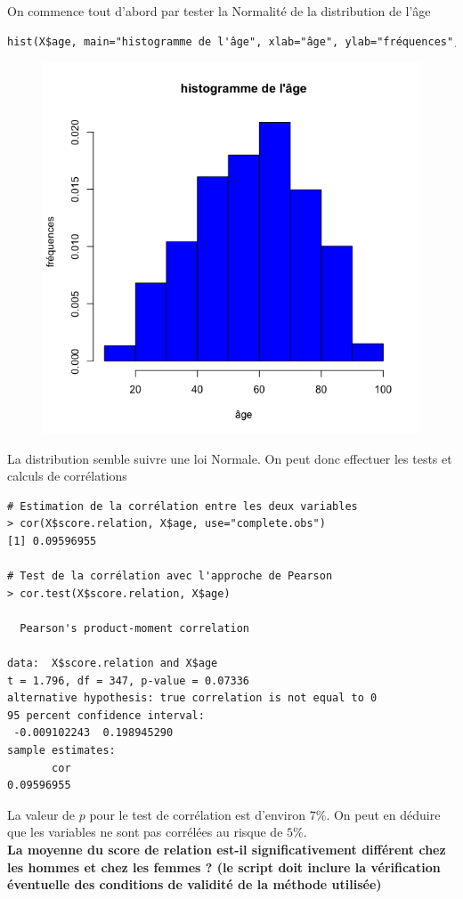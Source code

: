 On commence tout d'abord par tester la Normalité de la distribution de l'âge
\begin{lstlisting}[language=html]
hist(X$age, main="histogramme de l'âge", xlab="âge", ylab="fréquences",freq=F,col="blue")
\end{lstlisting}
\begin{figure}[H]\begin{center}\includegraphics[scale=0.5]{ilu/DEV21.png}\end{center}\end{figure}
La distribution semble suivre une loi Normale. On peut donc effectuer les tests et calculs de corrélations
\begin{lstlisting}[language=html]
# Estimation de la corrélation entre les deux variables 
> cor(X$score.relation, X$age, use="complete.obs")
[1] 0.09596955

# Test de la corrélation avec l'approche de Pearson
> cor.test(X$score.relation, X$age)

  Pearson's product-moment correlation

data:  X$score.relation and X$age
t = 1.796, df = 347, p-value = 0.07336
alternative hypothesis: true correlation is not equal to 0
95 percent confidence interval:
 -0.009102243  0.198945290
sample estimates:
       cor 
0.09596955 
\end{lstlisting}
La valeur de $p$ pour le test de corrélation est d'environ $7\%$. On peut en déduire que les variables ne sont pas corrélées au risque de $5\%$.\newline
\\
\textbf{La moyenne du score de relation est-il significativement différent chez les hommes et chez les femmes ? (le script doit inclure la vérification éventuelle des conditions de validité de la méthode utilisée)}


